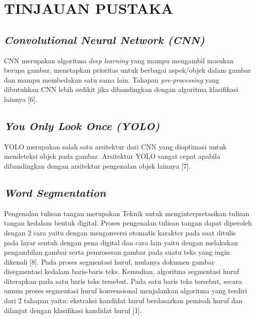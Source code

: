 \section{TINJAUAN PUSTAKA}

\subsection{\textit{Convolutional  Neural Network (CNN)}}
CNN merupakan algoritma \textit{deep learning} yang mampu mengambil masukan berupa gambar, menetapkan prioritas untuk berbagai aspek/objek dalam gambar dan mampu membedakan satu sama lain. Tahapan \textit{pre-processing} yang dibutuhkan CNN lebih sedikit jika dibandingkan dengan algoritma klasifikasi lainnya [6].


\subsection{\textit{You Only Look Once (YOLO)}}
YOLO merupakan salah satu arsitektur dari CNN yang dioptimasi untuk mendeteksi objek pada gambar. Arsitektur YOLO sangat cepat apabila dibandingkan dengan arsitektur pengenalan objek lainnya [7]. 


\subsection{\textit{Word Segmentation}}
Pengenalan tulisan tangan merupakan Teknik untuk menginterpretasikan tulisan tangan kedalam bentuk digital. Proses pengenalan tulisan tangan dapat diperoleh dengan 2 cara yaitu dengan mengonversi otomatis karakter pada saat ditulis pada layar sentuh dengan pena digital dan cara lain yaitu dengan melakukan pengambilan gambar serta pemrosesan gambar pada suatu teks yang ingin dikenali [8]. Pada proses segmentasi huruf, mulanya dokumen gambar disegmentasi kedalam baris-baris teks. Kemudian, algoritma segmentasi huruf diterapkan pada satu baris teks tersebut. Pada satu baris teks tersebut, secara umum proses segmentasi huruf konvensional menjalankan algoritma yang terdiri dari 2 tahapan yaitu: ekstraksi kandidat huruf berdasarkan pemisah huruf dan dilanjut dengan klasifikasi kandidat huruf [1].


